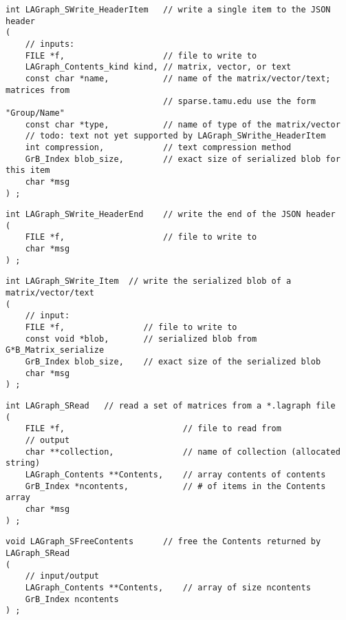 \begin{verbatim}
int LAGraph_SWrite_HeaderItem   // write a single item to the JSON header
(
    // inputs:
    FILE *f,                    // file to write to
    LAGraph_Contents_kind kind, // matrix, vector, or text
    const char *name,           // name of the matrix/vector/text; matrices from
                                // sparse.tamu.edu use the form "Group/Name"
    const char *type,           // name of type of the matrix/vector
    // todo: text not yet supported by LAGraph_SWrithe_HeaderItem
    int compression,            // text compression method
    GrB_Index blob_size,        // exact size of serialized blob for this item
    char *msg
) ;
\end{verbatim}




\begin{verbatim}
int LAGraph_SWrite_HeaderEnd    // write the end of the JSON header
(
    FILE *f,                    // file to write to
    char *msg
) ;
\end{verbatim}




\begin{verbatim}
int LAGraph_SWrite_Item  // write the serialized blob of a matrix/vector/text
(
    // input:
    FILE *f,                // file to write to
    const void *blob,       // serialized blob from G*B_Matrix_serialize
    GrB_Index blob_size,    // exact size of the serialized blob
    char *msg
) ;
\end{verbatim}




\begin{verbatim}
int LAGraph_SRead   // read a set of matrices from a *.lagraph file
(
    FILE *f,                        // file to read from
    // output
    char **collection,              // name of collection (allocated string)
    LAGraph_Contents **Contents,    // array contents of contents
    GrB_Index *ncontents,           // # of items in the Contents array
    char *msg
) ;
\end{verbatim}




\begin{verbatim}
void LAGraph_SFreeContents      // free the Contents returned by LAGraph_SRead
(
    // input/output
    LAGraph_Contents **Contents,    // array of size ncontents
    GrB_Index ncontents
) ;
\end{verbatim}




